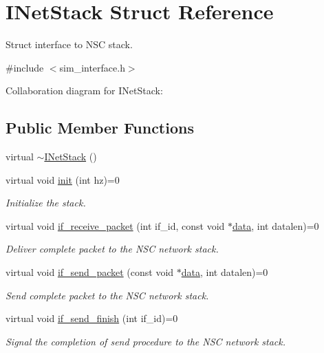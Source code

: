 \hypertarget{structINetStack}{}\section{I\+Net\+Stack Struct Reference}
\label{structINetStack}


Struct interface to N\+SC stack.  




{\ttfamily \#include $<$sim\+\_\+interface.\+h$>$}



Collaboration diagram for I\+Net\+Stack\+:
\subsection*{Public Member Functions}
\begin{DoxyCompactItemize}
\item 
virtual \hyperlink{structINetStack_aa4febc7e2b66d861acfba1f4beebda0e}{$\sim$\+I\+Net\+Stack} ()
\item 
virtual void \hyperlink{structINetStack_a586b23bb19f9161cd326a2df9a88e205}{init} (int hz)=0
\begin{DoxyCompactList}\small\item\em Initialize the stack. \end{DoxyCompactList}\item 
virtual void \hyperlink{structINetStack_a717976f6495da376e006b6ac1b54c086}{if\+\_\+receive\+\_\+packet} (int if\+\_\+id, const void $\ast$\hyperlink{topology-example-sim_8cc_a26c65296e316af77b787dc77469bb2a4}{data}, int datalen)=0
\begin{DoxyCompactList}\small\item\em Deliver complete packet to the N\+SC network stack. \end{DoxyCompactList}\item 
virtual void \hyperlink{structINetStack_a2aa79cbc69b2aa0003c2a0e727d6438a}{if\+\_\+send\+\_\+packet} (const void $\ast$\hyperlink{topology-example-sim_8cc_a26c65296e316af77b787dc77469bb2a4}{data}, int datalen)=0
\begin{DoxyCompactList}\small\item\em Send complete packet to the N\+SC network stack. \end{DoxyCompactList}\item 
virtual void \hyperlink{structINetStack_afffc356feed7f466f83c20804192df28}{if\+\_\+send\+\_\+finish} (int if\+\_\+id)=0
\begin{DoxyCompactList}\small\item\em Signal the completion of send procedure to the N\+SC network stack. \end{DoxyCompactList}\item 

\end{DoxyCompactItemize}
